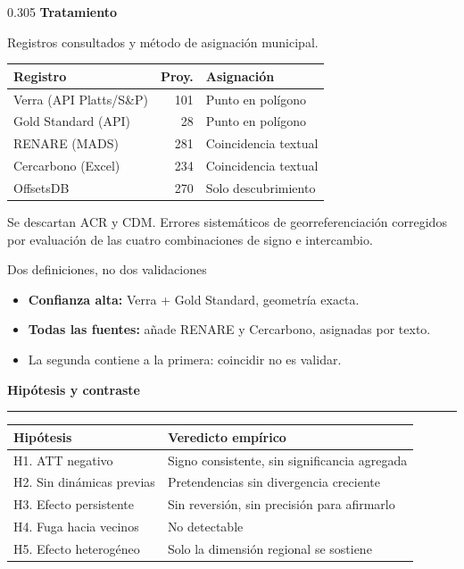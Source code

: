 \documentclass[final,t]{beamer}
\newcommand{\seccion}[2]{%
  \par\vspace{0.5\baselineskip}%
  {\color{dosel}\Large\bfseries #1\hfill{\color{tenue}\normalsize\mdseries #2}}\par
  \vspace{-0.35\baselineskip}%
  {\color{dosel}\rule{\linewidth}{2.2pt}}\par
  \vspace{0.25\baselineskip}%
}
\newcommand{\nota}[1]{{\color{tenue}\small #1\par}}
\begin{document}
\begin{frame}[t]{}
\begin{columns}[t]
\begin{column}{0.305\paperwidth}
\textbf{\large Tratamiento}
\nota{Registros consultados y método de asignación municipal.}
\begin{center}
\begin{tabularx}{\linewidth}{Xrl}
\toprule
\rowcolor{dosel}
\textcolor{papel}{\textbf{Registro}} & \textcolor{papel}{\textbf{Proy.}} &
\textcolor{papel}{\textbf{Asignación}}\\
\midrule
Verra (API Platts/S\&P) & 101 & Punto en polígono\\
Gold Standard (API)     & 28  & Punto en polígono\\
RENARE (MADS)           & 281 & Coincidencia textual\\
Cercarbono (Excel)      & 234 & Coincidencia textual\\
OffsetsDB               & 270 & Solo descubrimiento\\
\bottomrule
\end{tabularx}
\end{center}
\nota{Se descartan ACR y CDM. Errores sistemáticos de georreferenciación corregidos por
evaluación de las cuatro combinaciones de signo e intercambio.}

\begin{caja}{Dos definiciones, no dos validaciones}
\begin{itemize}
  \item \textbf{Confianza alta:} Verra + Gold Standard, geometría exacta.
  \item \textbf{Todas las fuentes:} añade RENARE y Cercarbono, asignadas por texto.
  \item[\textcolor{amazonia}{\rule{0.45ex}{0.45ex}}] La segunda contiene a la primera:
        coincidir no es validar.
\end{itemize}
\end{caja}

\seccion{Hipótesis y contraste}{}
\begin{center}
\begin{tabularx}{\linewidth}{lX}
\toprule
\rowcolor{dosel}
\textcolor{papel}{\textbf{Hipótesis}} & \textcolor{papel}{\textbf{Veredicto empírico}}\\
\midrule
H1. ATT negativo          & Signo consistente, sin significancia agregada\\
H2. Sin dinámicas previas & Pretendencias sin divergencia creciente\\
H3. Efecto persistente    & Sin reversión, sin precisión para afirmarlo\\
H4. Fuga hacia vecinos    & No detectable\\
H5. Efecto heterogéneo    & Solo la dimensión regional se sostiene\\
\bottomrule
\end{tabularx}
\end{center}


\end{column}
\end{columns}
\end{frame}
\end{document}
